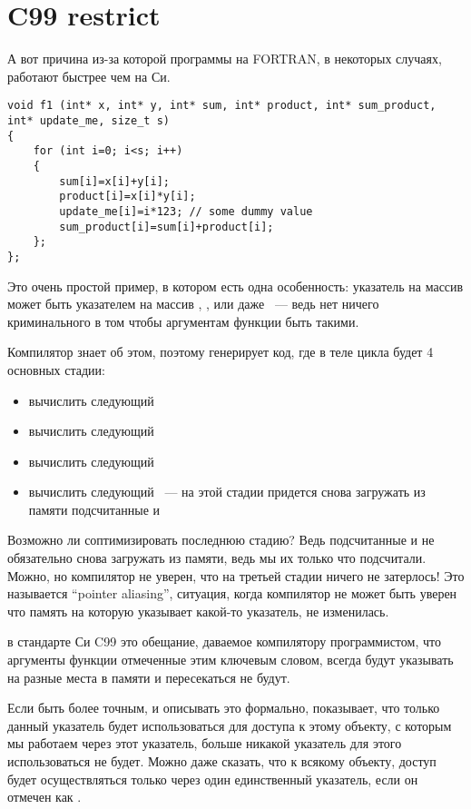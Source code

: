 \section{C99 restrict}

А вот причина из-за которой программы на FORTRAN, в некоторых случаях, работают быстрее чем на Си.

\begin{lstlisting}
void f1 (int* x, int* y, int* sum, int* product, int* sum_product, int* update_me, size_t s)
{
	for (int i=0; i<s; i++)
	{
		sum[i]=x[i]+y[i];
		product[i]=x[i]*y[i];
		update_me[i]=i*123; // some dummy value
		sum_product[i]=sum[i]+product[i];	
	};
};
\end{lstlisting}

Это очень простой пример, в котором есть одна особенность: указатель на массив  может быть указателем 
на массив
, , или даже  ~--- 
ведь нет ничего криминального в том чтобы аргументам функции быть такими.

Компилятор знает об этом, поэтому генерирует код, где в теле цикла будет 4 основных стадии:
\begin{itemize}
\item вычислить следующий 
\item вычислить следующий 
\item вычислить следующий 
\item вычислить следующий  ~--- на этой стадии придется снова загружать из 
      памяти подсчитанные  и 
\end{itemize}

Возможно ли соптимизировать последнюю стадию? Ведь подсчитанные  и  не обязательно 
снова загружать из памяти,
ведь мы их только что подсчитали. Можно, но компилятор не уверен, что на третьей стадии ничего не затерлось! Это называется
``pointer aliasing'', ситуация, когда компилятор не может быть уверен что память на которую указывает какой-то указатель, 
не изменилась.

 в стандарте Си C99\cite[6.7.3.1]{C99TC3} это обещание, даваемое компилятору программистом, 
что аргументы функции отмеченные этим 
ключевым словом,
всегда будут указывать на разные места в памяти и пересекаться не будут.

Если быть более точным, и описывать это формально,  показывает, что только данный указатель будет
использоваться для доступа к этому объекту, с которым мы работаем через этот указатель, больше никакой указатель для
этого использоваться не будет. Можно даже сказать, что к всякому объекту, доступ будет осуществляться только через
один единственный указатель, если он отмечен как .

